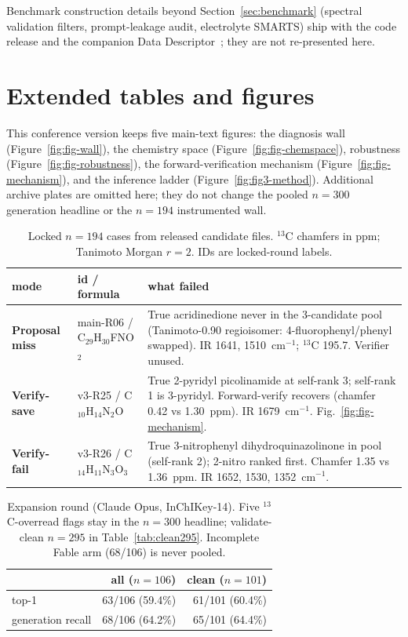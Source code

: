\documentclass{article}
\begin{document}
Benchmark construction details beyond Section~\ref{sec:benchmark} (spectral validation
filters, prompt-leakage audit, electrolyte SMARTS) ship with the code release and the
companion Data Descriptor~\citep{yabbarov2026irexp}; they are not re-presented here.

\section{Extended tables and figures}
\label{app:extended}

This conference version keeps five main-text figures: the diagnosis wall
(Figure~\ref{fig:fig-wall}), the chemistry space
(Figure~\ref{fig:fig-chemspace}), robustness (Figure~\ref{fig:fig-robustness}), the
forward-verification mechanism (Figure~\ref{fig:fig-mechanism}), and the inference
ladder (Figure~\ref{fig:fig3-method}).
Additional archive plates are omitted here; they do not change the pooled $n{=}300$
generation headline or the $n{=}194$ instrumented wall.

\begin{table}[h]
\caption{Locked $n{=}194$ cases from released candidate files.
$^{13}$C chamfers in ppm; Tanimoto Morgan $r{=}2$. IDs are locked-round labels.}
\label{tab:cases}
\centering
\scriptsize
\setlength{\tabcolsep}{3.5pt}
\begin{tabular}{@{}lp{2.15cm}p{8.75cm}@{}}
\toprule
mode & id / formula & what failed \\
\midrule
\textbf{Proposal miss} &
main-R06 / C$_{29}$H$_{30}$FNO$_{2}$ &
True acridinedione never in the 3-candidate pool (Tanimoto-0.90 regioisomer: 4-fluorophenyl/phenyl swapped).
IR 1641, 1510~cm$^{-1}$; $^{13}$C 195.7. Verifier unused. \\
\textbf{Verify-save} &
v3-R25 / C$_{10}$H$_{14}$N$_{2}$O &
True 2-pyridyl picolinamide at self-rank 3; self-rank 1 is 3-pyridyl.
Forward-verify recovers (chamfer 0.42 vs 1.30~ppm). IR 1679~cm$^{-1}$.
Fig.~\ref{fig:fig-mechanism}. \\
\textbf{Verify-fail} &
v3-R26 / C$_{14}$H$_{11}$N$_{3}$O$_{3}$ &
True 3-nitrophenyl dihydroquinazolinone in pool (self-rank 2); 2-nitro ranked first.
Chamfer 1.35 vs 1.36~ppm. IR 1652, 1530, 1352~cm$^{-1}$. \\
\bottomrule
\end{tabular}
\end{table}

\begin{table}[h]
\caption{Expansion round (Claude Opus, InChIKey-14). Five $^{13}$C-overread flags stay in
the $n{=}300$ headline; validate-clean $n{=}295$ in Table~\ref{tab:clean295}.
Incomplete Fable arm (68/106) is never pooled.}
\label{tab:expansion}
\centering
\begin{tabular}{@{}lrr@{}}
\toprule
 & all ($n{=}106$) & clean ($n{=}101$) \\
\midrule
top-1 & 63/106 (59.4\%) & 61/101 (60.4\%) \\
generation recall & 68/106 (64.2\%) & 65/101 (64.4\%) \\
\bottomrule
\end{tabular}
\end{table}
\end{document}
